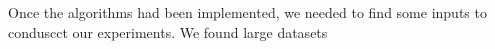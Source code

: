 \documentclass[../master/master.tex]{subfiles}
\begin{document}
Once the algorithms had been implemented, we needed to find some inputs to conduscct our experiments. We found large datasets 
\end{document}
